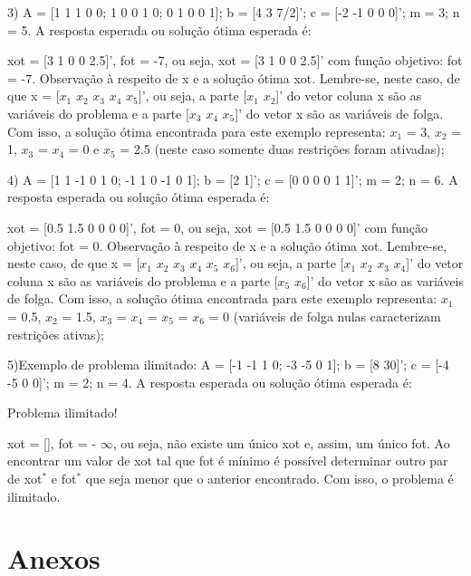 \documentclass[10pt]{article}
\begin{document}
3) A = [1 1 1 0 0; 1 0 0 1 0; 0 1 0 0 1]; b = [4 3 7/2]'; c = [-2 -1 0 0 0]'; m = 3; n = 5. A resposta esperada ou solução ótima esperada é:
\newline

xot = [3 1 0 0 2.5]', fot = -7, ou seja, xot = [3 1 0 0 2.5]' com função objetivo: fot = -7.
\newline
Observação à respeito de x e a solução ótima xot. Lembre-se, neste caso, de que x = [$x_1$ $x_2$ $x_3$ $x_4$ $x_5$]', ou seja, a parte [$x_1$ $x_2$]' do vetor coluna x são as variáveis do problema e a parte [$x_3$ $x_4$ $x_5$]' do vetor x são as variáveis de folga. Com isso, a solução ótima encontrada para este exemplo representa: $x_1$ = 3, $x_2$ = 1, $x_3$ = $x_4$ = 0 e $x_5$ = 2.5 (neste caso somente duas restrições foram ativadas);
\newline

4) A = [1 1 -1 0 1 0; -1 1 0 -1 0 1]; b = [2 1]'; c = [0 0 0 0 1 1]'; m = 2; n = 6. A resposta esperada ou solução ótima esperada é:
\newline

xot = [0.5 1.5 0 0 0 0]', fot = 0, ou seja, xot = [0.5 1.5 0 0 0 0]' com função objetivo: fot = 0.
\newline
Observação à respeito de x e a solução ótima xot. Lembre-se, neste caso, de que x = [$x_1$ $x_2$ $x_3$ $x_4$ $x_5$ $x_6$]', ou seja, a parte [$x_1$ $x_2$ $x_3$ $x_4$]' do vetor coluna x são as variáveis do problema e a parte [$x_5$ $x_6$]' do vetor x são as variáveis de folga. Com isso, a solução ótima encontrada para este exemplo representa: $x_1$ = 0.5, $x_2$ = 1.5, $x_3$ = $x_4$ = $x_5$ = $x_6$ = 0 (variáveis de folga nulas caracterizam restrições ativas);
\newline

5)Exemplo de problema ilimitado: A = [-1 -1 1 0; -3 -5 0 1]; b = [8 30]'; c = [-4 -5 0 0]'; m = 2; n = 4. A resposta esperada ou solução ótima esperada é:
\newline

Problema ilimitado!
\newline

xot = [], fot = - $\infty$, ou seja, não existe um único xot e, assim, um único fot. Ao encontrar um valor de xot tal que fot é mínimo é possível determinar outro par de xot$^{*}$ e fot$^{*}$ que seja menor que o anterior encontrado. Com isso, o problema é ilimitado.

\section{Anexos}
\end{document}
